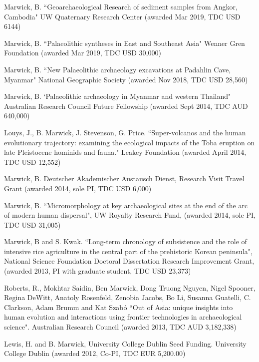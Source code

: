 \medskip

\ind  Marwick, B. ``Geoarchaeological Research of sediment samples from Angkor, Cambodia" UW Quaternary Research Center (awarded Mar 2019, TDC USD 6144)

\ind  Marwick, B. ``Palaeolithic syntheses in East and Southeast Asia" Wenner Gren Foundation (awarded Mar 2019, TDC USD 30,000)

\ind  Marwick, B. ``New Palaeolithic archaeology excavations at Padahlin Cave, Myanmar" National Geographic Society (awarded Nov 2018, TDC USD 28,560)

\ind  Marwick, B. `Palaeolithic archaeology in Myanmar and western Thailand" Australian Research Council Future Fellowship (awarded Sept 2014, TDC AUD 640,000)

\ind  Louys, J., B. Marwick, J. Stevenson, G. Price. ``Super-volcanos and the human evolutionary trajectory: examining the ecological impacts of the Toba eruption on late Pleistocene hominids and fauna." Leakey Foundation (awarded April 2014, TDC USD 12,552)

\ind  Marwick, B. Deutscher Akademischer Austausch Dienst, Research Visit Travel Grant (awarded 2014, sole PI, TDC USD 6,000)

\ind  Marwick, B. ``Micromorphology at key archaeological sites at the end of the arc of modern human dispersal", UW Royalty Research Fund, (awarded 2014, sole PI, TDC USD 31,005)

\ind  Marwick, B and S. Kwak. ``Long-term chronology of subsistence and the role of intensive rice agriculture in the central part of the prehistoric Korean peninsula", National Science Foundation Doctoral Dissertation Research Improvement Grant, (awarded 2013,  PI with graduate student, TDC USD 23,373)

\ind  Roberts, R., Mokhtar Saidin, Ben Marwick, Dong Truong Nguyen, Nigel Spooner, Regina DeWitt, Anatoly Rosenfeld, Zenobia Jacobs, Bo Li, Susanna Guatelli, C. Clarkson, Adam Brumm and Kat Szabó ``Out of Asia: unique insights into human evolution and interactions using frontier technologies in archaeological science".  Australian Research Council (awarded 2013, TDC AUD 3,182,338)

\ind Lewis, H. and B. Marwick,  University College Dublin Seed Funding. University College Dublin (awarded 2012, Co-PI, TDC EUR 5,200.00) 

